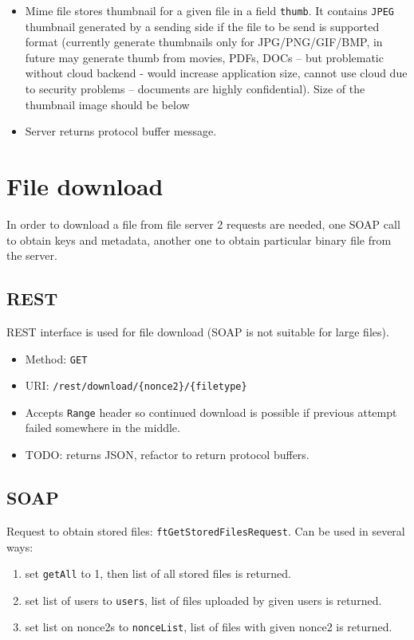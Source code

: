 \documentclass[a4paper,10pt]{article}
\begin{document}
\begin{itemize}
    \item Mime file stores thumbnail for a given file in a field \texttt{thumb}. It contains \texttt{JPEG} thumbnail generated by
	    a sending side if the file to be send is supported format (currently generate thumbnails only for JPG/PNG/GIF/BMP, in future
	    may generate thumb from movies, PDFs, DOCs -- but problematic without cloud backend - would increase application size, cannot 
	    use cloud due to security problems -- documents are highly confidential). Size of the thumbnail image should be below 
    
    \item Server returns protocol buffer message.
\end{itemize}



\newpage
\section{File download}
In order to download a file from file server 2 requests are needed, one SOAP call to obtain keys and metadata, another one to obtain particular 
binary file from the server.

\subsection{REST}
REST interface is used for file download (SOAP is not suitable for large files).
\begin{itemize}
 \item Method: \texttt{GET}
 \item URI: \texttt{/rest/download/\{nonce2\}/\{filetype\}}
 \item Accepts \texttt{Range} header so continued download is possible if previous attempt failed somewhere in the middle.
 \item TODO: returns JSON, refactor to return protocol buffers.
\end{itemize}

\subsection{SOAP}
Request to obtain stored files: \texttt{ftGetStoredFilesRequest}. Can be used in several ways:
\begin{enumerate}
 \item set \texttt{getAll} to 1, then list of all stored files is returned.
 \item set list of users to \texttt{users}, list of files uploaded by given users is returned.
 \item set list on nonce2s to \texttt{nonceList}, list of files with given nonce2 is returned.
\end{enumerate}
\end{document}
